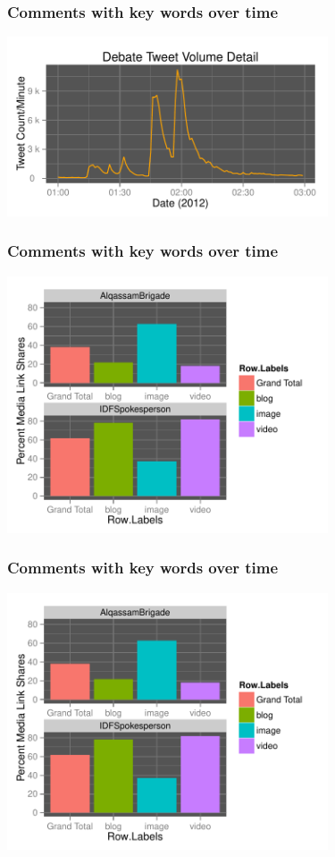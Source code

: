 \documentclass{beamer}
\begin{document}
\begin{frame}\frametitle{Comments with key words over time}
  \begin{center}
    \includegraphics[width=9.5cm]{./imgs/HI_minimal-leadup-pres-debate.pdf}
  \end{center}
\end{frame}

\begin{frame}\frametitle{Comments with key words over time}
  \begin{center}
    \includegraphics[width=9.5cm]{./imgs/HI_minimal-media.pdf}
  \end{center}
\end{frame}

\begin{frame}\frametitle{Comments with key words over time}
  \begin{center}
    \includegraphics[width=9.5cm]{./imgs/HI_minimal-media.pdf}
  \end{center}
\end{frame}
\end{document}
